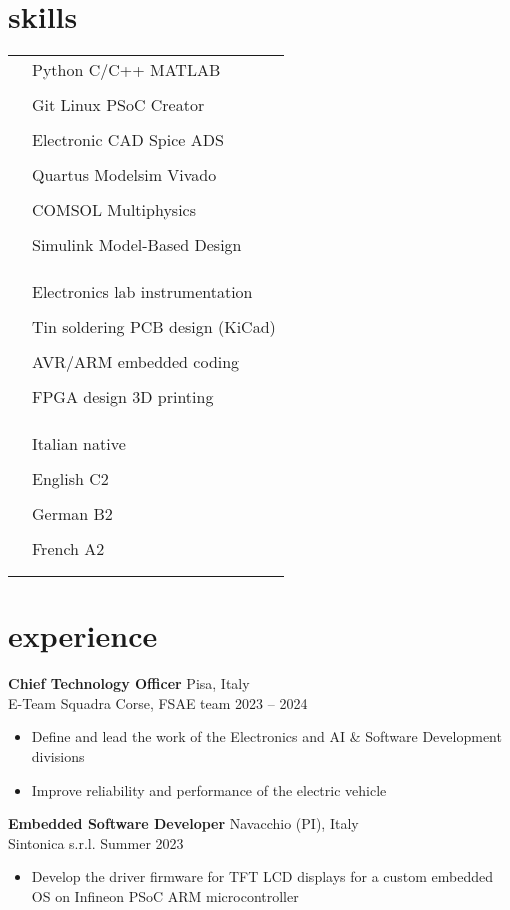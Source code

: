\documentclass[10pt]{article}
\newcommand{\entry}[4]{{{\textbf{#1}}} \hfill #3 \\ #2 \hfill #4}
\newcommand{\tableentry}[3]{\textsc{#1} & #2\expandafter\ifstrequal\expandafter{#3}{}{\\}{\\[6pt]}}
\begin{document}
\begin{paracol}{2}
\switchcolumn

\section{skills}
\begin{supertabular}{rl}
  \tableentry{\footnotesize\faCode}{Python \textperiodcentered{} C/C++ \textperiodcentered{} MATLAB}{}
  \tableentry{}{Git \textperiodcentered{} Linux \textperiodcentered{} PSoC Creator}{}
  \tableentry{}{Electronic CAD \textperiodcentered{} Spice \textperiodcentered{} ADS}{}
  \tableentry{}{Quartus \textperiodcentered{} Modelsim \textperiodcentered{} Vivado}{}
  \tableentry{}{COMSOL Multiphysics}{}
  \tableentry{}{Simulink Model-Based Design}{}
  \tableentry{}{}{}

  \tableentry{\footnotesize\faBolt}{Electronics lab instrumentation}{}
  \tableentry{}{Tin soldering \textperiodcentered{} PCB design (KiCad)}
  {}
  \tableentry{}{AVR/ARM embedded coding}{}
  \tableentry{}{FPGA design \textperiodcentered{} 3D printing}{}
  \tableentry{}{}{}
  
  \tableentry{\footnotesize\faLanguage}{Italian \textperiodcentered{} native}{}
  \tableentry{}{English \textperiodcentered{} C2}{}
  \tableentry{}{German \textperiodcentered{} B2}{}
  \tableentry{}{French \textperiodcentered{} A2}{}
\end{supertabular}

\switchcolumn*

\section{experience}

\entry{Chief Technology Officer}{E-Team Squadra Corse, FSAE team}{Pisa, Italy}{2023 -- 2024}
\begin{itemize}[noitemsep,leftmargin=3.5mm,rightmargin=0mm,topsep=6pt]
  \item Define and lead the work of the Electronics and AI \& Software Development divisions
  \item Improve reliability and performance of the electric vehicle 
\end{itemize}

\smallskip

\entry{Embedded Software Developer}{Sintonica s.r.l.}{Navacchio (PI), Italy}{Summer 2023}
\begin{itemize}[noitemsep,leftmargin=3.5mm,rightmargin=0mm,topsep=6pt]
  \item Develop the driver firmware for TFT LCD displays for a custom embedded OS on Infineon PSoC ARM microcontroller
\end{itemize}


\end{paracol}
\end{document}
